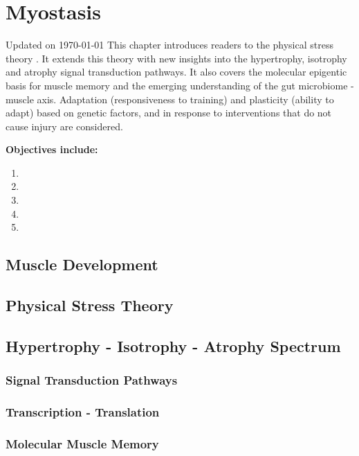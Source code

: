 \chapter{Myostasis}\label{chp:myostasis}
Updated on \today
\minitoc
This chapter introduces readers to the physical stress theory \cite{mueller_tissue_2002}. It extends this theory with new insights into the hypertrophy, isotrophy and atrophy signal transduction pathways. It also covers the molecular epigentic basis for muscle memory and the emerging understanding of the gut microbiome - muscle axis. Adaptation (responsiveness to training) and plasticity (ability to adapt) based on genetic factors, and in response to interventions that do not cause injury are considered.

\vspace{5mm}

\textbf{Objectives include:}
\begin{enumerate}
    \item
    \item
    \item
    \item
    \item
\end{enumerate}

\section{Muscle Development}

\section{Physical Stress Theory}

\section{Hypertrophy - Isotrophy - Atrophy Spectrum}

\subsection{Signal Transduction Pathways}

\subsection{Transcription - Translation}

\subsection{Molecular Muscle Memory}


